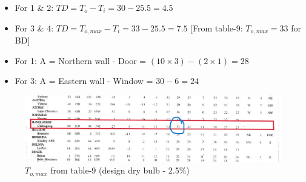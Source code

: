 \documentclass{article}
\begin{document}
\begin{itemize}
  \item For 1 \& 2: $TD = T_o - T_i = 30 - 25.5 = 4.5$
  \item For 3 \& 4: $TD = T_{o,max} - T_i = 33 - 25.5 = 7.5$ [From table-9: $T_{o,max} = 33$ for BD]
  \item For 1: A = Northern wall - Door = $(10 \times 3) - (2 \times 1) = 28$ 
  \item For 3: A = Eastern wall - Window = $30 - 6 = 24$
\end{itemize}
\begin{figure}[H]
  \begin{center}
    \includegraphics[width=\columnwidth]{img/t_o_max.jpeg}
    \caption{$T_{o,max}$ from table-9 (design dry bulb - 2.5\%)}
  \end{center}
\end{figure}
\end{document}
